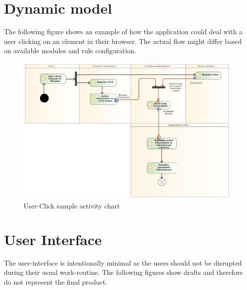 
\newpage %
\section{Dynamic model} %
\label{sec:sm_dynamic_models}
The following figure shows an example of how the application could deal with a \gls{user} clicking on an element in their \gls{browser}. The actual flow might differ based on available modules and rule configuration.
\begin{figure}[H]
  \includegraphics[width=1.00\textwidth]{resources/clickactivity.png}
  \centering
  \caption{User-Click sample activity chart}
  \label{fig:sm_clickactivity}
\end{figure}
\newpage %
\section{User Interface}
\label{sec:sm_userinterface}
The \gls{user}-interface is intentionally minimal as the \glspl{user} should not be disrupted during their usual work-routine. The following figures show drafts and therefore do not represent the final product.

